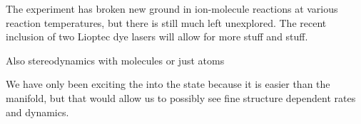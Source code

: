 The experiment has broken new ground in ion-molecule reactions at various reaction temperatures, but there is still much left unexplored. The recent inclusion of two Lioptec dye lasers will allow for more stuff and stuff.

Also stereodynamics with molecules or just atoms

We have only been exciting the  into the  state because it is easier than the  manifold, but that would allow us to possibly see fine structure dependent rates and dynamics.